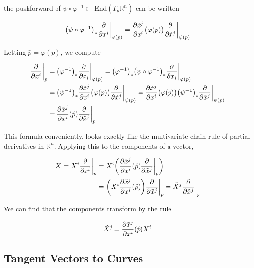 \documentclass{article}
\theoremstyle{remark}
\theoremstyle{definition}
\begin{document}
      the pushforward of $\psi \circ \varphi^{-1} \in$ End$(T_p \mathbb{R}^n)$ can be written

        \[\big( \psi \circ \varphi^{-1}\big)_* \frac{\partial}{\partial x^i} \bigg|_{\varphi(p)} = \frac{\partial \Tilde{x}^j}{\partial x^i} \big( \varphi(p) \big) \frac{\partial}{\partial \Tilde{x}^j} \bigg|_{\psi(p)}\]

      Letting $\bar{p} = \varphi(p)$, we compute

      \begin{align*}
        \frac{\partial}{\partial x^i} \bigg|_p & = \big( \varphi^{-1} \big)_* \frac{\partial}{\partial x_i} \bigg|_{\varphi(p)} = \big( \varphi^{-1} \big)_* \big( \psi \circ \varphi^{-1} \big)_* \frac{\partial}{\partial x_i} \bigg|_{\varphi(p)} \\ 
        & = \big( \psi^{-1}\big)_* \frac{\partial \Tilde{x}^j}{\partial x^i} \big( \varphi(p)\big) \frac{\partial}{\partial \Tilde{x}^j} \bigg|_{\psi(p)} = \frac{\partial \Tilde{x}^j}{\partial x^i} \big( \varphi(p)\big) \big( \psi^{-1}\big)_* \frac{\partial}{\partial \Tilde{x}^j} \bigg|_{\psi (p)} \\
        & = \frac{\partial \Tilde{x}^j}{\partial x^i} (\hat{p}) \frac{\partial}{\partial \Tilde{x}^j} \bigg|_p
      \end{align*}

      This formula conveniently, looks exactly like the multivariate chain rule of partial derivatives in $\mathbb{R}^n$. Applying this to the components of a vector, 

      \begin{align*}
        X = X^i \frac{\partial}{\partial x^i} \bigg|_p & = X^i \bigg( \frac{\partial \Tilde{x}^j}{\partial x^i} (\hat{p}) \frac{\partial}{\partial \Tilde{x}^j} \bigg|_p \bigg) \\
        & = \bigg(X^i \frac{\partial \Tilde{x}^j}{\partial x^i} (\hat{p}) \bigg) \frac{\partial}{\partial \Tilde{x}^j} \bigg|_p =
        \Tilde{X}^j \frac{\partial}{\partial \Tilde{x}^j} \bigg|_p
      \end{align*}

      We can find that the components transform by the rule 

        \[\Tilde{X}^j = \frac{\partial \Tilde{x}^j}{\partial x^i} (\hat{p}) X^i\]

  \subsection{Tangent Vectors to Curves}
\end{document}
